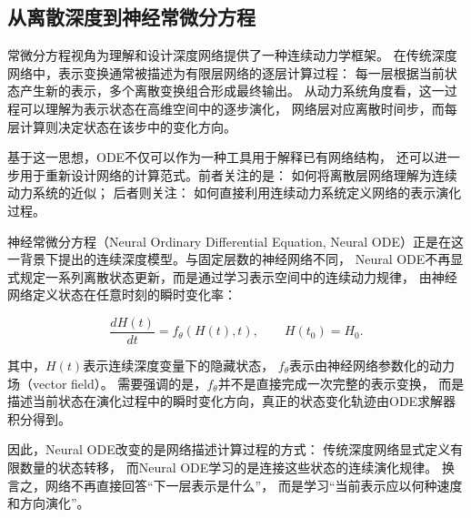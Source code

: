 \subsection{从离散深度到神经常微分方程}

常微分方程视角为理解和设计深度网络提供了一种连续动力学框架。
在传统深度网络中，表示变换通常被描述为有限层网络的逐层计算过程：
每一层根据当前状态产生新的表示，多个离散变换组合形成最终输出。
从动力系统角度看，这一过程可以理解为表示状态在高维空间中的逐步演化，
网络层对应离散时间步，而每层计算则决定状态在该步中的变化方向。

基于这一思想，ODE不仅可以作为一种工具用于解释已有网络结构，
还可以进一步用于重新设计网络的计算范式。前者关注的是：
如何将离散层网络理解为连续动力系统的近似；
后者则关注：
如何直接利用连续动力系统定义网络的表示演化过程。

神经常微分方程（Neural Ordinary Differential Equation,
Neural ODE）正是在这一背景下提出的连续深度模型。与固定层数的神经网络不同，
Neural ODE不再显式规定一系列离散状态更新，而是通过学习表示空间中的连续动力规律，
由神经网络定义状态在任意时刻的瞬时变化率：

\begin{equation}
\frac{dH(t)}{dt}
=
f_\theta(H(t),t),
\qquad
H(t_0)=H_0 .
\end{equation}

其中，$H(t)$表示连续深度变量下的隐藏状态，
$f_\theta$表示由神经网络参数化的动力场（vector field）。
需要强调的是，$f_\theta$并不是直接完成一次完整的表示变换，
而是描述当前状态在演化过程中的瞬时变化方向，真正的状态变化轨迹由ODE求解器积分得到。

因此，Neural ODE改变的是网络描述计算过程的方式：
传统深度网络显式定义有限数量的状态转移，
而Neural ODE学习的是连接这些状态的连续演化规律。
换言之，网络不再直接回答“下一层表示是什么”，
而是学习“当前表示应以何种速度和方向演化”。

